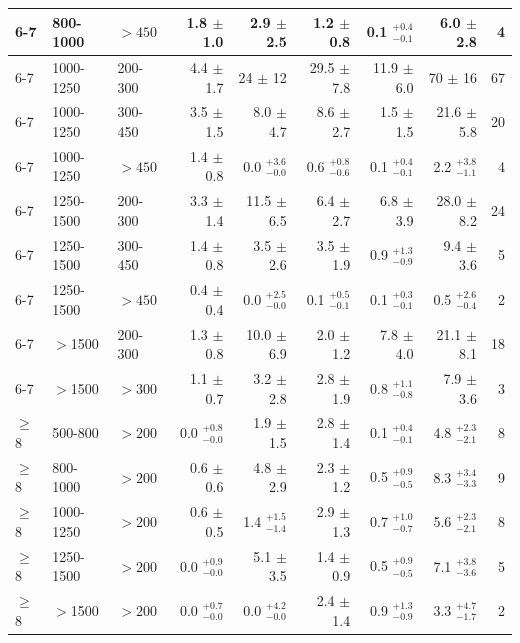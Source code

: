 \begin{table}[!hp]
{\begin{tabular}{lll|r|r|r|r|r|r}
      6-7     & 800-1000   & $>450$   &    1.8 $\pm$    1.0       &    2.9 $\pm$    2.5      &   1.2 $\pm$    0.8      &  0.1 $^{+0.4}_{-0.1}$       & 6.0    $\pm$    2.8    &     4  \\ \hline
      6-7     & 1000-1250  & 200-300  &    4.4 $\pm$    1.7       &   24   $\pm$   12        &  29.5 $\pm$    7.8      & 11.9 $\pm$    6.0       &  70    $\pm$   16      &    67  \\
      6-7     & 1000-1250  & 300-450  &    3.5 $\pm$    1.5       &    8.0 $\pm$    4.7      &   8.6 $\pm$    2.7      &  1.5 $\pm$    1.5       & 21.6   $\pm$    5.8    &    20  \\
      6-7     & 1000-1250  & $>450$   &    1.4 $\pm$    0.8       &    0.0 $^{+3.6}_{-0.0}$      &   0.6 $^{+0.8}_{-0.6}$      &  0.1 $^{+0.4}_{-0.1}$       & 2.2    $^{+3.8}_{-1.1}$    &     4  \\ \hline
      6-7     & 1250-1500  & 200-300  &    3.3 $\pm$    1.4       &   11.5 $\pm$    6.5      &   6.4 $\pm$    2.7      &  6.8 $\pm$    3.9       & 28.0   $\pm$    8.2    &    24  \\
      6-7     & 1250-1500  & 300-450  &    1.4 $\pm$    0.8       &    3.5 $\pm$    2.6      &   3.5 $\pm$    1.9      &  0.9 $^{+1.3}_{-0.9}$       & 9.4    $\pm$    3.6    &     5  \\
      6-7     & 1250-1500  & $>450$   &    0.4 $\pm$    0.4       &    0.0 $^{+2.5}_{-0.0}$      &   0.1 $^{+0.5}_{-0.1}$      &  0.1 $^{+0.3}_{-0.1}$       & 0.5    $^{+2.6}_{-0.4}$    &     2  \\ \hline
      6-7     & $>$1500    & 200-300  &    1.3 $\pm$    0.8       &   10.0 $\pm$    6.9      &   2.0 $\pm$    1.2      &  7.8 $\pm$    4.0       & 21.1   $\pm$    8.1    &    18  \\
      6-7     & $>$1500    & $>300$   &    1.1 $\pm$    0.7       &    3.2 $\pm$    2.8      &   2.8 $\pm$    1.9      &  0.8 $^{+1.1}_{-0.8}$       & 7.9    $\pm$    3.6    &     3  \\ \hline \hline 
      $\geq$8 & 500-800    & $>200$   &    0.0 $^{+0.8}_{-0.0}$       &    1.9 $\pm$    1.5      &   2.8 $\pm$    1.4      &  0.1 $^{+0.4}_{-0.1}$       & 4.8    $^{+2.3}_{-2.1}$    &     8  \\
      $\geq$8 & 800-1000   & $>200$   &    0.6 $\pm$    0.6       &    4.8 $\pm$    2.9      &   2.3 $\pm$    1.2      &  0.5 $^{+0.9}_{-0.5}$       & 8.3    $^{+3.4}_{-3.3}$    &     9  \\
      $\geq$8 & 1000-1250  & $>200$   &    0.6 $\pm$    0.5       &    1.4 $^{+1.5}_{-1.4}$      &   2.9 $\pm$    1.3      &  0.7 $^{+1.0}_{-0.7}$       & 5.6    $^{+2.3}_{-2.1}$    &     8  \\
      $\geq$8 & 1250-1500  & $>200$   &    0.0 $^{+0.9}_{-0.0}$       &    5.1 $\pm$    3.5      &   1.4 $\pm$    0.9      &  0.5 $^{+0.9}_{-0.5}$       & 7.1    $^{+3.8}_{-3.6}$    &     5  \\
      $\geq$8 & $>$1500    & $>200$   &    0.0 $^{+0.7}_{-0.0}$       &    0.0 $^{+4.2}_{-0.0}$      &   2.4 $\pm$    1.4      &  0.9 $^{+1.3}_{-0.9}$       & 3.3    $^{+4.7}_{-1.7}$    &     2  \\ \hline \hline



\end{tabular}}
\end{table}
